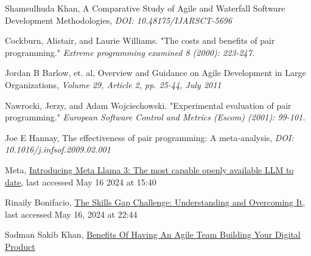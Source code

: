 \documentclass{article}
\begin{document}
\begin{thebibliography}{1000}
    Shamsulhuda Khan,
    A Comparative Study of Agile and Waterfall Software Development Methodologies, \textit{DOI: 10.48175/IJARSCT-5696}
    
    Cockburn, Alistair, and Laurie Williams. "The costs and benefits of pair programming." \textit{Extreme programming examined 8 (2000): 223-247.}
    
    Jordan B Barlow, et. al, Overview and Guidance on Agile Development in Large Organizations, \textit{Volume 29, Article 2, pp. 25-44, July 2011}



    Nawrocki, Jerzy, and Adam Wojciechowski. "Experimental evaluation of pair programming." \textit{European Software Control and Metrics (Escom) (2001): 99-101.}

    Joe E Hannay, The effectiveness of pair programming: A meta-analysis, \textit{DOI: 10.1016/j.infsof.2009.02.001}


    Meta, \href{https://ai.meta.com/blog/meta-llama-3/}{Introducing Meta Llama 3: The most capable openly available LLM to date}, last accessed May 16 2024 at 15:40

    Rinaily Bonifacio, \href{https://www.shiftbase.com/glossary/skills-gap}{The Skills Gap Challenge: Understanding and Overcoming It}, last accessed May 16, 2024 at 22:44

    Sadman Sakib Khan, \href{https://polygontechnology.io/benefits-of-having-an-agile-team-building-your-digital-product/}{Benefits Of Having An Agile Team Building Your Digital Product}

\end{thebibliography}
\end{document}
